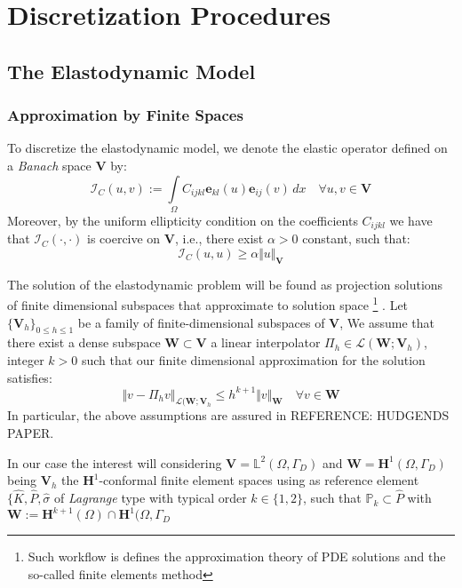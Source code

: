 \chapter{Discretization Procedures}



\section{The Elastodynamic Model}
\subsection{Approximation by Finite Spaces}
To discretize the elastodynamic model, we denote the elastic operator defined on a \textit{Banach} space $\mathbf{V}$ by:
\begin{equation*}
    \mathcal{I}_C (u,v) := \int \limits_{\Omega} C_{ijkl}\mathbf{e}_{kl}(u) \mathbf{e}_{ij}(v) \, dx \quad \forall u,v \in \mathbf{V}
\end{equation*}
Moreover, by the uniform ellipticity condition on the coefficients $C_{ijkl}$ we have that $\mathcal{I}_{C}(\cdot, \cdot)$ is coercive on $\mathbf{V}$, i.e., there exist $\alpha > 0$ constant, such that:
\begin{equation*}
    \mathcal{I}_C (u,u) \geq  \alpha \Vert u \Vert_{\mathbf{V}}
\end{equation*}

The solution of the elastodynamic problem will be found as projection solutions of finite dimensional subspaces that approximate to solution space \footnote{Such workflow is defines the approximation theory of PDE solutions and the so-called finite elements method} \cite{ern2004theory}.
Let $\{\mathbf{V}_h \}_{0 \leq h \leq 1}$ be a family of finite-dimensional subspaces of $\mathbf{V}$, We assume that there exist a dense subspace $\mathbf{W} \subset \mathbf{V}$ a linear interpolator $\Pi_h \in \mathcal{L}(\mathbf{W};\mathbf{V}_h)$, integer $k > 0$ such that our finite dimensional approximation for the solution satisfies:
\begin{equation*}
    \Vert v - \Pi_h v \Vert_{\mathcal{L}(\mathbf{W};\mathbf{V}_h} \leq h^{k+1} \Vert v \Vert_{\mathbf{W}} \quad \forall v \in \mathbf{W}
\end{equation*}
In particular, the above assumptions are assured in REFERENCE: HUDGENDS PAPER.
\begin{rem}
In our case the interest will considering $\mathbf{V} = \mathbb{L}^2(\Omega, \Gamma_D)$ and $\mathbf{W} = \mathbf{H}^1(\Omega, \Gamma_D)$ being $\mathbf{V}_h$ the $\mathbf{H}^1$-conformal finite element spaces using as reference element $\{ \hat{K}, \hat{P}, \hat{\sigma}$ of \textit{Lagrange} type with typical order $k \in \{1,2\}$, such that $\mathbb{P}_k \subset \hat{P}$ with $\mathbf{W} := \mathbf{H}^{k+1}(\Omega) \cap \mathbf{H}^1(\Omega, \Gamma_D$
\end{rem}

